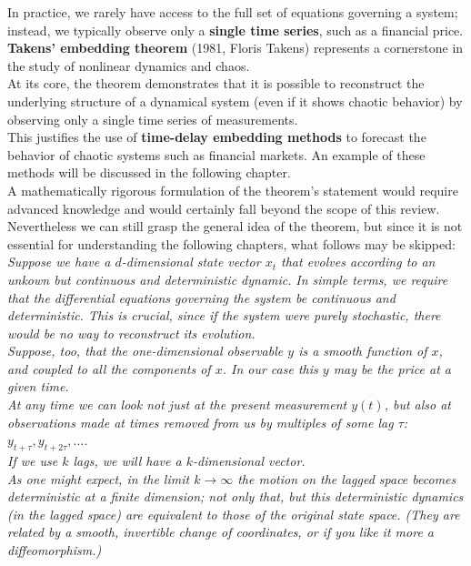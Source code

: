 In practice, we rarely have access to the full set of equations governing a system; instead, we typically observe only a \textbf{single time series}, such as a financial price.\\

\textbf{Takens' embedding theorem} (1981, Floris Takens) represents a cornerstone in the study of nonlinear dynamics and chaos.\\

At its core, the theorem demonstrates that it is possible to reconstruct the underlying structure of a dynamical system (even if it shows chaotic behavior) by observing only a single time series of measurements.\\

This justifies the use of \textbf{time-delay embedding methods} to forecast the behavior of chaotic systems such as financial markets. An example of these methods will be discussed in the following chapter.\\

A mathematically rigorous formulation of the theorem's statement would require advanced knowledge and would certainly fall beyond the scope of this review.\\

Nevertheless we can still grasp the general idea of the theorem, but since it is not essential for understanding the following chapters, what follows may be skipped:\\

\textit{Suppose we have a $d$-dimensional state vector $x_t$ that evolves according to an unkown but continuous and deterministic dynamic.} \textit{In simple terms, we require that the differential equations governing the system be continuous and deterministic. This is crucial, since if the system were purely stochastic, there would be no way to reconstruct its evolution.}\\
\textit{Suppose, too, that the one-dimensional observable $y$ is a smooth function of $x$, and coupled to all the components of $x$. In our case this $y$ may be the price at a given time.}\\

\textit{At any time we can look not just at the present measurement $y(t)$, but also at observations made at times removed from us by multiples of some lag $\tau$: $y_{t+\tau},y_{t+2\tau},...$.\\}
\textit{If we use $k$ lags, we will have a $k$-dimensional vector.\\}
\textit{As one might expect, in the limit $k \to \infty$ the motion on the lagged space becomes deterministic at a finite dimension; not only that, but this deterministic dynamics (in the lagged space) are equivalent to those of the original state space. (They are related by a smooth, invertible change of coordinates, or if you like it more a diffeomorphism.)}



